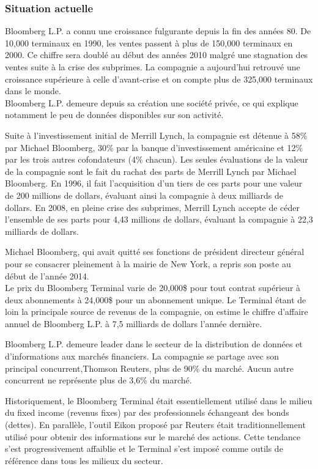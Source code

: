\documentclass[11pt, oneside, titlepage, a4paper]{article}
\begin{document}
		\subsubsection{Situation actuelle}
Bloomberg L.P. a connu une croissance fulgurante depuis la fin des années 80. De 10,000 terminaux en 1990, les ventes passent à plus de 150,000 terminaux en 2000. Ce chiffre sera doublé au début des années 2010 malgré une stagnation des ventes suite à la crise des subprimes. La compagnie a aujourd'hui retrouvé une croissance supérieure à celle d'avant-crise et on compte plus de 325,000 terminaux dans le monde.
\\

Bloomberg L.P. demeure depuis sa création une société privée, ce qui explique notamment le peu de données disponibles sur son activité.

Suite à l'investissement initial de Merrill Lynch, la compagnie est détenue à 58\% par Michael Bloomberg, 30\% par la banque d'investissement américaine et 12\% par les trois autres cofondateurs (4\% chacun). Les seules évaluations de la valeur de la compagnie sont le fait du rachat des parts de Merrill Lynch par Michael Bloomberg. En 1996, il fait l'acquisition d'un tiers de ces parts pour une valeur de 200 millions de dollars, évaluant ainsi la compagnie à deux milliards de dollars. En 2008, en pleine crise des subprimes, Merrill Lynch accepte de céder l'ensemble de ses parts pour 4,43 millions de dollars, évaluant la compagnie à 22,3 milliards de dollars.

Michael Bloomberg, qui avait quitté ses fonctions de président directeur général pour se consacrer pleinement à la mairie de New York, a repris son poste au début de l'année 2014.
\\

Le prix du Bloomberg Terminal varie de 20,000\$ pour tout contrat supérieur à deux abonnements à 24,000\$ pour un abonnement unique. Le Terminal étant de loin la principale source de revenus de la compagnie, on estime le chiffre d'affaire annuel de Bloomberg L.P. à 7,5 milliards de dollars l'année dernière.

Bloomberg L.P. demeure leader dans le secteur de la distribution de données et d'informations aux marchés financiers. La compagnie se partage avec son principal concurrent,Thomson Reuters, plus de 90\% du marché. Aucun autre concurrent ne représente plus de 3,6\% du marché.

Historiquement, le Bloomberg Terminal était essentiellement utilisé dans le milieu du fixed income (revenus fixes) par des professionnels échangeant des bonds (dettes). En parallèle, l'outil Eikon proposé par Reuters était traditionnellement utilisé pour obtenir des informations sur le marché des actions. Cette tendance s'est progressivement affaiblie et le Terminal s'est imposé comme outils de référence dans tous les milieux du secteur.
\end{document}
